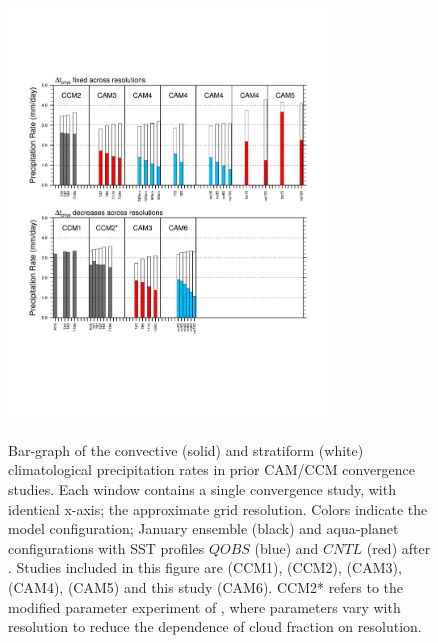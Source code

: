 \documentclass[times]{qjrms4}
\begin{document}
\begin{figure}[t]
\begin{center}
\noindent\includegraphics[width=20pc,angle=0]{figs/cam-history.pdf}\\
\end{center}
\caption{Bar-graph of the convective (solid) and stratiform (white) climatological precipitation rates in prior CAM/CCM convergence studies. Each window contains a single convergence study, with identical x-axis; the approximate grid resolution. Colors indicate the model configuration; January ensemble (black) and aqua-planet configurations with SST profiles $QOBS$ (blue) and $CNTL$ (red) after \cite{NH2000ASL}. Studies included in this figure are \cite{KW1991JGR} (CCM1), \cite{WETAL1995CD} (CCM2), \cite{W2008TELLUS} (CAM3), \cite{RETAL2013JCLIM,ZetAl2014JCb,HR2017JCLIM} (CAM4), \cite{ZetAl2014JCb} (CAM5) and this study (CAM6). CCM2* refers to the modified parameter experiment of \cite{WETAL1995CD}, where parameters vary with resolution to reduce the dependence of cloud fraction on resolution.}
\label{fig:cam-history}
\end{figure}
\end{document}
